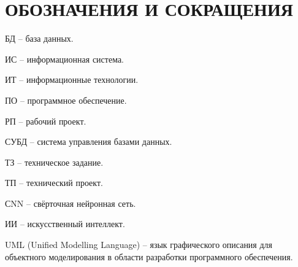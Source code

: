 \section*{ОБОЗНАЧЕНИЯ И СОКРАЩЕНИЯ}

БД -- база данных.

ИС -- информационная система.

ИТ -- информационные технологии. 

ПО -- программное обеспечение.

РП -- рабочий проект.

СУБД -- система управления базами данных.

ТЗ -- техническое задание.

ТП -- технический проект.

СNN -- свёрточная нейронная сеть.

ИИ -- искусственный интеллект.

UML (Unified Modelling Language) -- язык графического описания для объектного моделирования в области разработки программного обеспечения.
